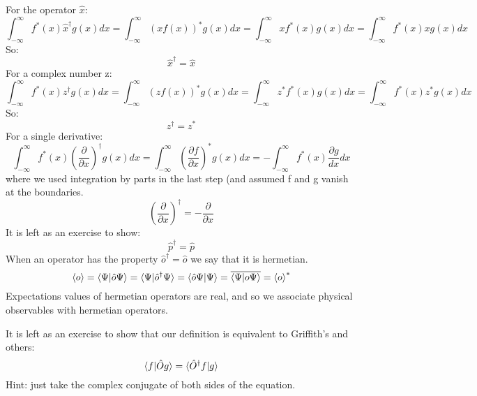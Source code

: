 \documentclass[12pt]{book}
\begin{document}
For the operator $\hat{x}$:
\begin{equation*}
\int_{-\infty}^{\infty} f^*(x)\hat{x}^\dagger g(x) dx = 
\int_{-\infty}^{\infty} \left(x f(x)\right)^* g(x) dx = 
\int_{-\infty}^{\infty} x f^*(x) g(x) dx = 
\int_{-\infty}^{\infty} f^*(x) x g(x) dx 
\end{equation*}
So:
\begin{equation}
\hat{x}^\dagger = \hat{x}
\end{equation}
For a complex number z:
\begin{equation*}
\int_{-\infty}^{\infty} f^*(x)z^\dagger g(x) dx = 
\int_{-\infty}^{\infty} \left(z f(x)\right)^* g(x) dx = 
\int_{-\infty}^{\infty} z^* f^*(x) g(x) dx = 
\int_{-\infty}^{\infty} f^*(x) z^* g(x) dx 
\end{equation*}
So:
\begin{equation}
z^\dagger = z^*
\end{equation}
For a single derivative:
\begin{equation*}
\int_{-\infty}^{\infty} f^*(x) \left( \frac{\partial}{\partial x} \right)^\dagger g(x) dx = 
\int_{-\infty}^{\infty} \left(\frac{\partial f}{\partial x}\right)^* g(x) dx = 
-\int_{-\infty}^{\infty} f^*(x) \frac{\partial g}{dx} dx  
\end{equation*}
where we used integration by parts in the last step (and assumed f and g vanish at the boundaries.
\begin{equation}
\left( \frac{\partial}{\partial x} \right)^{\dagger} = -\frac{\partial}{\partial x}
\end{equation}
It is left as an exercise to show:
\begin{equation}
\hat{p}^\dagger = \hat{p}
\end{equation}
When an operator has the property $\hat{o}^\dagger = \hat{o}$ we say that it is hermetian.  
\begin{equation}
\braket{o} = \braket{\Psi|\hat{o}\Psi} = \braket{\Psi|\hat{o}^\dagger \Psi}
= \braket{\hat{o} \Psi| \Psi} = \overline{\braket{\Psi| o \Psi}} = \braket{o}^*
\end{equation}
Expectations values of hermetian operators are real, and so we associate physical observables with hermetian operators. 

It is left as an exercise to show that our definition is equivalent to Griffith's and others:
$$\braket{f|\hat{O}g} = \braket{\hat{O}^\dagger f|g}$$
Hint: just take the complex conjugate of both sides of the equation.
\end{document}
